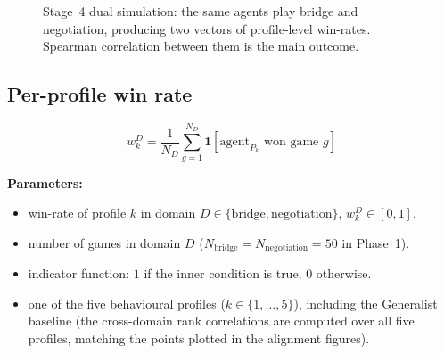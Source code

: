 \documentclass[11pt, a4paper, oneside, openany]{report}
\begin{document}
\begin{figure}[H]
\centering
{}
\caption{Stage~4 dual simulation: the same agents play bridge and negotiation, producing two vectors of profile-level win-rates. Spearman correlation between them is the main outcome.}
\label{fig:stage4_arch}
\end{figure}

\subsection{Per-profile win rate}

\begin{equation}
\label{eq:winrate}
w_k^D = \frac{1}{N_D} \sum_{g = 1}^{N_D} \mathbf{1}[\text{agent}_{P_k} \text{ won game } g]
\end{equation}

\noindent\textbf{Parameters:}
\begin{itemize}[leftmargin=2.2cm, itemsep=0pt, topsep=2pt]
    \item[$w_k^D$] win-rate of profile $k$ in domain $D \in \{\text{bridge}, \text{negotiation}\}$, $w_k^D \in [0, 1]$.
    \item[$N_D$] number of games in domain $D$ ($N_{\text{bridge}} = N_{\text{negotiation}} = 50$ in Phase~1).
    \item[{$\mathbf{1}[\cdot]$}] indicator function: $1$ if the inner condition is true, $0$ otherwise.
    \item[$P_k$] one of the five behavioural profiles ($k \in \{1, \ldots, 5\}$), including the Generalist baseline (the cross-domain rank correlations are computed over all five profiles, matching the points plotted in the alignment figures).
\end{itemize}
\end{document}
